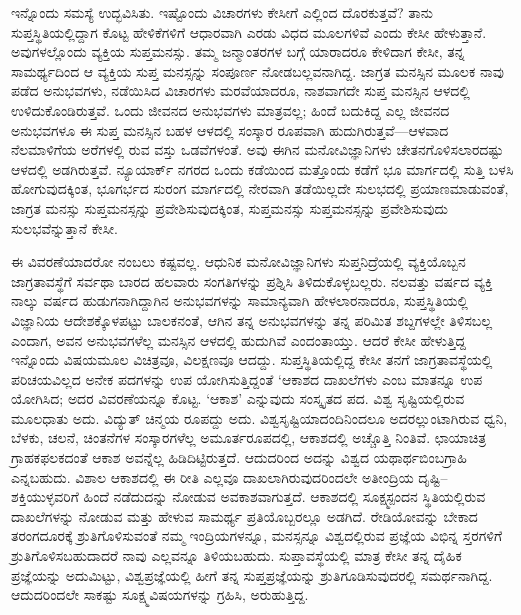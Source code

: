 ಇನ್ನೊಂದು ಸಮಸ್ಯೆ ಉದ್ಭವಿಸಿತು. ಇಷ್ಟೊಂದು ವಿಚಾರಗಳು ಕೇಸೀಗೆ ಎಲ್ಲಿಂದ ದೊರಕುತ್ತವೆ? ತಾನು ಸುಪ್ತಸ್ಥಿತಿಯಲ್ಲಿದ್ದಾಗ ಕೊಟ್ಟ ಹೇಳಿಕೆಗಳಿಗೆ ಆಧಾರವಾಗಿ ಎರಡು ವಿಧದ ಮೂಲಗಳಿವೆ ಎಂದು ಕೇಸೀ ಹೇಳುತ್ತಾನೆ. ಅವುಗಳಲ್ಲೊಂದು ವ್ಯಕ್ತಿಯ ಸುಪ್ತಮನಸ್ಸು. ತಮ್ಮ ಜನ್ಮಾಂತರಗಳ ಬಗ್ಗೆ ಯಾರಾದರೂ ಕೇಳಿದಾಗ ಕೇಸೀ, ತನ್ನ ಸಾಮರ್ಥ್ಯದಿಂದ ಆ ವ್ಯಕ್ತಿಯ ಸುಪ್ತ ಮನಸ್ಸನ್ನು ಸಂಪೂರ್ಣ ನೋಡಬಲ್ಲವನಾಗಿದ್ದ. ಜಾಗ್ರತ ಮನಸ್ಸಿನ ಮೂಲಕ ನಾವು ಪಡೆದ ಅನುಭವಗಳು, ನಡೆಯಿಸಿದ ವಿಚಾರಗಳು ಮರವೆಯಾದರೂ, ನಾಶವಾಗದೇ ಸುಪ್ತ ಮನಸ್ಸಿನ ಆಳದಲ್ಲಿ ಉಳಿದುಕೊಂಡಿರುತ್ತವೆ. ಒಂದು ಜೀವನದ ಅನುಭವಗಳು ಮಾತ್ರವಲ್ಲ; ಹಿಂದೆ ಬದುಕಿದ್ದ ಎಲ್ಲ ಜೀವನದ ಅನುಭವಗಳೂ ಈ ಸುಪ್ತ ಮನಸ್ಸಿನ  ಬಹಳ ಆಳದಲ್ಲಿ ಸಂಸ್ಕಾರ ರೂಪವಾಗಿ ಹುದುಗಿರುತ್ತವೆ—ಆಳವಾದ ನೆಲಮಾಳಿಗೆಯ ಅರೆಗಳಲ್ಲಿ ರುವ ವಸ್ತು ಒಡವೆಗಳಂತೆ. ಅವು ಈಗಿನ ಮನೋವಿಜ್ಞಾನಿಗಳು ಚೇತನಗೊಳಿಸಲಾರದಷ್ಟು ಆಳದಲ್ಲಿ ಅಡಗಿರುತ್ತವೆ. ನ್ಯೂಯಾರ್ಕ್ ನಗರದ ಒಂದು ಕಡೆಯಿಂದ ಮತ್ತೊಂದು ಕಡೆಗೆ ಭೂ ಮಾರ್ಗದಲ್ಲಿ ಸುತ್ತಿ ಬಳಸಿ ಹೋಗುವುದಕ್ಕಿಂತ, ಭೂಗರ್ಭದ ಸುರಂಗ ಮಾರ್ಗದಲ್ಲಿ ನೇರವಾಗಿ ತಡೆಯಿಲ್ಲದೇ ಸುಲಭದಲ್ಲಿ ಪ್ರಯಾಣಮಾಡುವಂತೆ, ಜಾಗ್ರತ ಮನಸ್ಸು ಸುಪ್ತಮನಸ್ಸನ್ನು ಪ್ರವೇಶಿಸುವುದಕ್ಕಿಂತ, ಸುಪ್ತಮನಸ್ಸು ಸುಪ್ತಮನಸ್ಸನ್ನು ಪ್ರವೇಶಿಸುವುದು ಸುಲಭವೆನ್ನುತ್ತಾನೆ ಕೇಸೀ.

ಈ ವಿವರಣೆಯಾದರೋ ನಂಬಲು ಕಷ್ಟವಲ್ಲ. ಆಧುನಿಕ ಮನೋವಿಜ್ಞಾನಿಗಳು ಸುಪ್ತನಿದ್ರೆಯಲ್ಲಿ ವ್ಯಕ್ತಿಯೊಬ್ಬನ ಜಾಗ್ರತಾವಸ್ಥೆಗೆ ಸರ್ವಥಾ ಬಾರದ ಹಲವಾರು ಸಂಗತಿಗಳನ್ನು ಪ್ರಶ್ನಿಸಿ ತಿಳಿದುಕೊಳ್ಳಬಲ್ಲರು. ನಲವತ್ತು ವರ್ಷದ ವ್ಯಕ್ತಿ ನಾಲ್ಕು ವರ್ಷದ ಹುಡುಗನಾಗಿದ್ದಾಗಿನ ಅನುಭವಗಳನ್ನು ಸಾಮಾನ್ಯವಾಗಿ ಹೇಳಲಾರನಾದರೂ, ಸುಪ್ತಸ್ಥಿತಿಯಲ್ಲಿ ವಿಜ್ಞಾನಿಯ ಆದೇಶಕ್ಕೊಳಪಟ್ಟು ಬಾಲಕನಂತೆ, ಆಗಿನ ತನ್ನ ಅನುಭವಗಳನ್ನು ತನ್ನ ಪರಿಮಿತ ಶಬ್ದಗಳಲ್ಲೇ ತಿಳಿಸಬಲ್ಲ ಎಂದಾಗ, ಅವನ ಅನುಭವಗಳೆಲ್ಲ ಮನಸ್ಸಿನ ಆಳದಲ್ಲಿ ಹುದುಗಿವೆ ಎಂದಂತಾಯ್ತು. ಆದರೆ ಕೇಸೀ ಹೇಳುತ್ತಿದ್ದ ಇನ್ನೊಂದು ವಿಷಯಮೂಲ ವಿಚಿತ್ರವೂ, ವಿಲಕ್ಷಣವೂ ಆದದ್ದು. ಸುಪ್ತಸ್ಥಿತಿಯಲ್ಲಿದ್ದ ಕೇಸೀ ತನಗೆ ಜಾಗ್ರತಾವಸ್ಥೆಯಲ್ಲಿ ಪರಿಚಯವಿಲ್ಲದ ಅನೇಕ ಪದಗಳನ್ನು ಉಪ ಯೋಗಿಸುತ್ತಿದ್ದಂತೆ ‘ಆಕಾಶದ ದಾಖಲೆಗಳು ಎಂಬ ಮಾತನ್ನೂ ಉಪ ಯೋಗಿಸಿದ; ಅದರ ವಿವರಣೆಯನ್ನೂ ಕೊಟ್ಟ. ‘ಆಕಾಶ’ ಎನ್ನುವುದು ಸಂಸ್ಕೃತದ ಪದ. ವಿಶ್ವ ಸೃಷ್ಟಿಯಲ್ಲಿರುವ ಮೂಲಧಾತು ಅದು. ವಿದ್ಯುತ್ ಚಿನ್ಮಯ  ರೂಪದ್ದು ಅದು. ವಿಶ್ವಸೃಷ್ಟಿಯಾದಂದಿ\-ನಿಂದಲೂ ಅದರಲ್ಲುಂಟಾಗಿರುವ ಧ್ವನಿ, ಬೆಳಕು, ಚಲನೆ, ಚಿಂತನೆಗಳ ಸಂಸ್ಕಾರಗಳೆಲ್ಲ ಅಮೂರ್ತ\-ರೂಪದಲ್ಲಿ, ಆಕಾಶದಲ್ಲಿ ಅಚ್ಚೊತ್ತಿ ನಿಂತಿವೆ. ಛಾಯಾಚಿತ್ರ ಗ್ರಾಹಕಫಲಕದಂತೆ ಆಕಾಶ ಅವನ್ನೆಲ್ಲ ಹಿಡಿದಿಟ್ಟಿರುತ್ತದೆ. ಆದುದರಿಂದ ಅದನ್ನು ವಿಶ್ವದ ಯಥಾರ್ಥಬಿಂಬಗ್ರಾಹಿ ಎನ್ನಬಹುದು. ವಿಶಾಲ ಆಕಾಶದಲ್ಲಿ ಈ ರೀತಿ ಎಲ್ಲವೂ ದಾಖಲಾಗಿರುವುದರಿಂದಲೇ ಅತೀಂದ್ರಿಯ ದೃಷ್ಟಿ–ಶಕ್ತಿಯುಳ್ಳವರಿಗೆ ಹಿಂದೆ ನಡೆದುದನ್ನು ನೋಡುವ ಅವಕಾಶವಾಗುತ್ತದೆ. ಆಕಾಶದಲ್ಲಿ ಸೂಕ್ಷ್ಮಸ್ಪಂದನ ಸ್ಥಿತಿಯಲ್ಲಿರುವ ದಾಖಲೆಗಳನ್ನು ನೋಡುವ ಮತ್ತು ಹೇಳುವ ಸಾಮರ್ಥ್ಯ ಪ್ರತಿಯೊಬ್ಬರಲ್ಲೂ ಅಡಗಿದೆ. ರೇಡಿಯೋವನ್ನು ಬೇಕಾದ ತರಂಗದೂರಕ್ಕೆ ಶ್ರುತಿಗೊಳಿಸುವಂತೆ ನಮ್ಮ ಇಂದ್ರಿಯಗಳನ್ನೂ, ಮನಸ್ಸನ್ನೂ ವಿಶ್ವದಲ್ಲಿರುವ ಪ್ರಜ್ಞೆಯ ವಿಭಿನ್ನ ಸ್ತರಗಳಿಗೆ ಶ್ರುತಿಗೊಳಿಸಬಹುದಾದರೆ ನಾವು ಎಲ್ಲವನ್ನೂ ತಿಳಿಯಬಹುದು. ಸುಪ್ತಾವಸ್ಥೆಯಲ್ಲಿ ಮಾತ್ರ ಕೇಸೀ ತನ್ನ ದೈಹಿಕ ಪ್ರಜ್ಞೆಯನ್ನು ಅದುಮಿಟ್ಟು, ವಿಶ್ವಪ್ರಜ್ಞೆಯಲ್ಲಿ ಹೀಗೆ ತನ್ನ ಸುಪ್ತಪ್ರಜ್ಞೆಯನ್ನು ಶ್ರುತಿಗೂಡಿಸುವುದರಲ್ಲಿ ಸಮರ್ಥನಾಗಿದ್ದ. ಆದುದರಿಂದಲೇ ಸಾಕಷ್ಟು ಸೂಕ್ಷ್ಮವಿಷಯಗಳನ್ನು ಗ್ರಹಿಸಿ, ಅರುಹುತ್ತಿದ್ದ.


